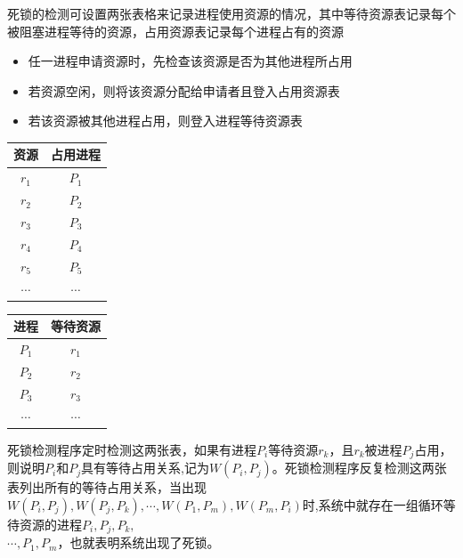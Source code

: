 \documentclass[cs4size,a4paper,10pt]{ctexart}
\begin{document}
	死锁的检测可设置两张表格来记录进程使用资源的情况，其中等待资源表记录每个被阻塞进程等待的资源，占用资源表记录每个进程占有的资源
	\begin{itemize}
		\item 任一进程申请资源时，先检查该资源是否为其他进程所占用
		\item 若资源空闲，则将该资源分配给申请者且登入占用资源表
		\item 若该资源被其他进程占用，则登入进程等待资源表
	\end{itemize}
	\begin{center}
		\begin{minipage}[c]{0.2\textwidth}
			\centering
				\begin{tabular}{|c|c|}
				\hline
				资源       & 占用进程     \\ \hline
				$r_1$    & $P_1$    \\ \hline
				$r_2$    & $P_2$    \\ \hline
				$r_3$    & $P_3$    \\ \hline
				$r_4$    & $P_4$    \\ \hline
				$r_5$    & $P_5$    \\ \hline
				$\cdots$ & $\cdots$ \\ \hline
				\end{tabular}
		\end{minipage}
		\hspace{.15in}
		\begin{minipage}[c]{0.2\textwidth}
			\centering
				\begin{tabular}{|c|c|}
				\hline
				进程       & 等待资源     \\ \hline
				$P_1$    & $r_1$    \\ \hline
				$P_2$    & $r_2$    \\ \hline
				$P_3$    & $r_3$    \\ \hline
				$\cdots$ & $\cdots$ \\ \hline
				\end{tabular}
		\end{minipage}
	\end{center}
	死锁检测程序定时检测这两张表，如果有进程$P_i$等待资源$r_k$，且$r_k$被进程$P_j$占用，则说明$P_i$和$P_j$具有等待占用关系,记为$W(P_i,P_j)$。死锁检测程序反复检测这两张表列出所有的等待占用关系，当出现$W(P_i,P_j),W(P_j,P_k),\cdots,W(P_1,P_m),W(P_m,P_i)$时,系统中就存在一组循环等待资源的进程$P_i,P_j,P_k,$\\$\cdots,P_1,P_m$，也就表明系统出现了死锁。
\end{document}
